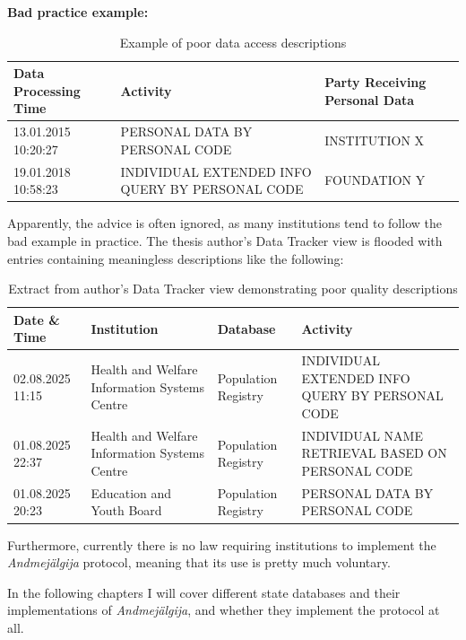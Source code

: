 \textbf{Bad practice example:}

\begin{table}[H]
\centering
\begin{tabular}{|p{3cm}|p{6cm}|p{4cm}|}
\hline
\textbf{Data Processing Time} & \textbf{Activity} & \textbf{Party Receiving Personal Data} \\
\hline
13.01.2015 10:20:27 & PERSONAL DATA BY PERSONAL CODE & INSTITUTION X \\
\hline
19.01.2018 10:58:23 & INDIVIDUAL EXTENDED INFO QUERY BY PERSONAL CODE & FOUNDATION Y \\
\hline
\end{tabular}
\caption{Example of poor data access descriptions}
\end{table}

Apparently, the advice is often ignored, as many institutions tend to follow the bad example in practice. The thesis author's Data Tracker view is flooded with entries containing meaningless descriptions like the following:

\begin{table}[H]
\centering
\begin{tabular}{|p{2.5cm}|p{5cm}|p{3cm}|p{3.5cm}|}
\hline
\textbf{Date \& Time} & \textbf{Institution} & \textbf{Database} & \textbf{Activity} \\
\hline
02.08.2025 11:15 & Health and Welfare Information Systems Centre & Population Registry & INDIVIDUAL EXTENDED INFO QUERY BY PERSONAL CODE \\
\hline
01.08.2025 22:37 & Health and Welfare Information Systems Centre & Population Registry & INDIVIDUAL NAME RETRIEVAL BASED ON PERSONAL CODE \\
\hline
01.08.2025 20:23 & Education and Youth Board & Population Registry & PERSONAL DATA BY PERSONAL CODE \\
\hline
\end{tabular}
\caption{Extract from author's Data Tracker view demonstrating poor quality descriptions}
\end{table}

Furthermore, currently there is no law requiring institutions to implement the \textit{Andmejälgija} protocol, meaning that its use is pretty much voluntary.

In the following chapters I will cover different state databases and their implementations of \textit{Andmejälgija}, and whether they implement the protocol at all.